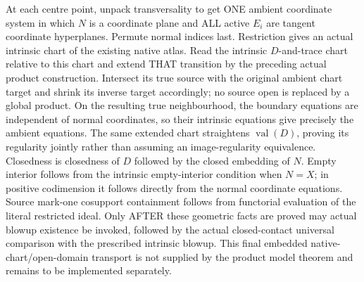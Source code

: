 At each centre point, unpack transversality to get ONE ambient coordinate
system in which $N$ is a coordinate plane and ALL active $E_i$ are tangent
coordinate hyperplanes. Permute normal indices last. Restriction gives an
actual intrinsic chart of the existing native atlas. Read the intrinsic
$D$-and-trace chart relative to this chart and extend THAT transition by the
preceding actual product construction. Intersect its true source with the
original ambient chart target and shrink its inverse target accordingly;
no source open is replaced by a global product. On the resulting true
neighbourhood, the boundary equations are independent of normal coordinates,
so their intrinsic equations give precisely the ambient equations. The same
extended chart straightens $\operatorname{val}(D)$, proving its regularity
jointly rather than assuming an image-regularity equivalence. Closedness is
closedness of $D$ followed by the closed embedding of $N$. Empty interior
follows from the intrinsic empty-interior condition when $N=X$; in positive
codimension it follows directly from the normal coordinate equations. Source
mark-one cosupport containment follows from functorial evaluation of the
literal restricted ideal. Only AFTER these geometric facts are proved may
actual blowup existence be invoked, followed by the actual closed-contact
universal comparison with the prescribed intrinsic blowup. This final
embedded native-chart/open-domain transport is not supplied by the product
model theorem and remains to be implemented separately.
